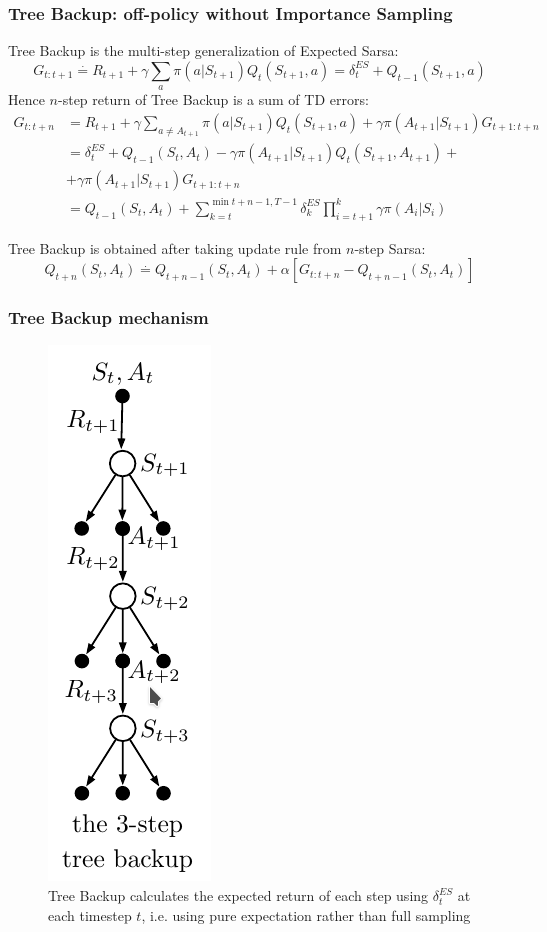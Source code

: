 \documentclass{beamer}
\begin{document}
\begin{frame}
  \frametitle{Tree Backup: off-policy without Importance Sampling}
  Tree Backup is the multi-step generalization of Expected Sarsa:
  $$G_{t : t + 1} \overset{\cdot}{=} R_{t + 1} +
      \gamma \sum_{a} \pi(a | S_{t + 1}) Q_t(S_{t + 1}, a) = \delta^{ES}_t
        + Q_{t - 1}(S_{t + 1}, a)$$
  Hence $n$-step return of Tree Backup is a sum of TD errors:
  \begin{align*}
    G_{t : t + n}
      &=
      R_{t + 1} + \gamma \sum_{a \neq A_{t + 1}} \pi(a | S_{t + 1})
        Q_t(S_{t + 1}, a) + \gamma \pi(A_{t + 1} | S_{t + 1}) G_{t + 1 : t + n}
      \\
      &= \delta_t^{ES} + Q_{t - 1} (S_t, A_t) - \gamma
        \pi(A_{t + 1} | S_{t + 1}) Q_t(S_{t + 1}, A_{t + 1}) +
      \\
      &+ \gamma \pi(A_{t + 1} | S_{t + 1}) G_{t + 1 : t + n}
      \\
      &= Q_{t -1}(S_t, A_t) +
      \sum_{k = t}^{\min{t + n - 1, T - 1}} \delta_k^{ES} \prod_{i = t + 1}^k
      \gamma \pi(A_i | S_i)
  \end{align*}

  Tree Backup is obtained after taking update rule from $n$-step Sarsa:
  $$Q_{t + n}(S_t, A_t) \overset{\cdot}{=} Q_{t + n - 1}(S_t, A_t) +
    \alpha[G_{t : t + n} - Q_{t + n -1}(S_t, A_t)]$$
\end{frame}

\begin{frame}
  \frametitle{Tree Backup mechanism}
  \begin{figure}
    \centering
    \includegraphics[height=0.7 \textheight]{tree_backup}
    \caption{Tree Backup calculates the expected return of each step using
      $\delta_t^{ES}$ at each timestep $t$, i.e. using pure expectation rather
      than full sampling}
  \end{figure}
\end{frame}
\end{document}
